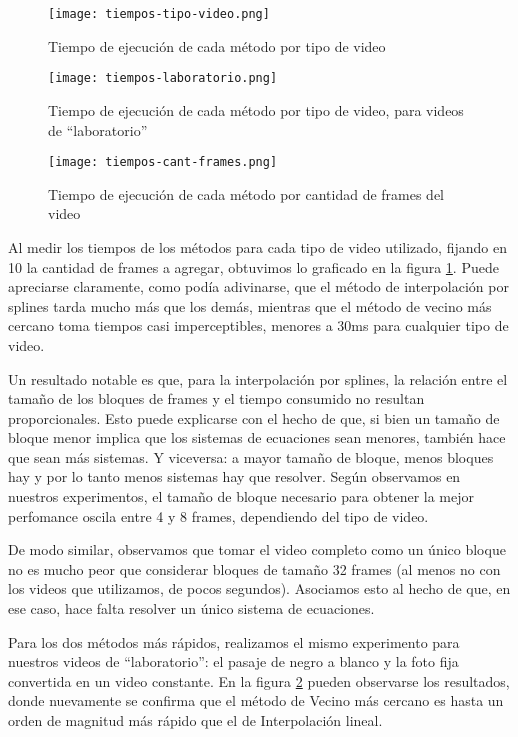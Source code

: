 \begin{figure}[h!]
  \centering
    \texttt{[image: tiempos-tipo-video.png]}
     \caption{Tiempo de ejecución de cada método por tipo de video}\label{fig:tiempos}
\end{figure}
\noindent


\begin{figure}[h!]
  \centering
    \texttt{[image: tiempos-laboratorio.png]}
     \caption{Tiempo de ejecución de cada método por tipo de video, para videos de ``laboratorio''}\label{fig:tiempos-lab}
\end{figure}
\noindent

\begin{figure}[h!]
  \centering
    \texttt{[image: tiempos-cant-frames.png]}
     \caption{Tiempo de ejecución de cada método por cantidad de frames del video}\label{fig:tiempos-cant-frames}
\end{figure}
\noindent


Al medir los tiempos de los métodos para cada tipo de video utilizado, fijando en 10 la cantidad de frames a agregar, obtuvimos lo graficado en la figura \ref{fig:tiempos}. Puede apreciarse claramente, como podía adivinarse, que el método de interpolación por splines tarda mucho más que los demás, mientras que el método de vecino más cercano toma tiempos casi imperceptibles, menores a 30ms para cualquier tipo de video.

Un resultado notable es que, para la interpolación por splines, la relación entre el tamaño de los bloques de frames y el tiempo consumido no resultan proporcionales. Esto puede explicarse con el hecho de que, si bien un tamaño de bloque menor implica que los sistemas de ecuaciones sean menores, también hace que sean más sistemas. Y viceversa: a mayor tamaño de bloque, menos bloques hay y por lo tanto menos sistemas hay que resolver. Según observamos en nuestros experimentos, el tamaño de bloque necesario para obtener la mejor perfomance oscila entre 4 y 8 frames, dependiendo del tipo de video.

De modo similar, observamos que tomar el video completo como un único bloque no es mucho peor que considerar bloques de tamaño 32 frames (al menos no con los videos que utilizamos, de pocos segundos). Asociamos esto al hecho de que, en ese caso, hace falta resolver un único sistema de ecuaciones.

Para los dos métodos más rápidos, realizamos el mismo experimento para nuestros videos de ``laboratorio'': el pasaje de negro a blanco y la foto fija convertida en un video constante. En la figura \ref{fig:tiempos-lab} pueden observarse los resultados, donde nuevamente se confirma que el método de Vecino más cercano es hasta un orden de magnitud más rápido que el de Interpolación lineal.

